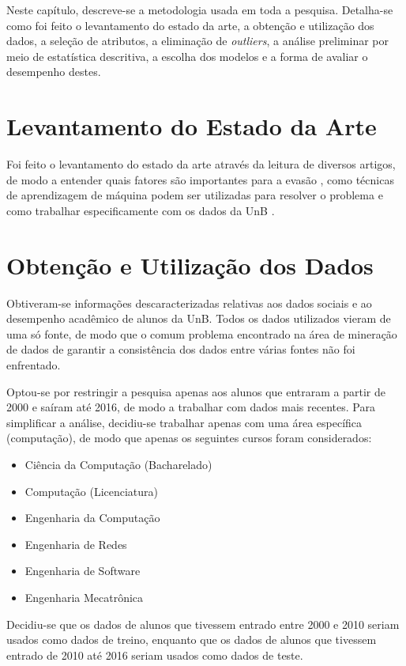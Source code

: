 Neste capítulo, descreve-se a metodologia usada em toda a pesquisa. 
Detalha-se como foi feito o levantamento
do estado da arte, a obtenção e utilização dos dados, a seleção de
atributos, a eliminação de \textit{outliers}, a análise preliminar por meio de estatística
descritiva, a escolha dos modelos e a forma de avaliar o desempenho destes.  

\section{Levantamento do Estado da Arte}
Foi feito o levantamento do estado da arte através da leitura de diversos artigos, de
modo a entender quais fatores são importantes para a evasão \cite{adeodato}
\cite{hoed_fatores} \cite{dropout_finland}, como técnicas de
aprendizagem de máquina podem ser utilizadas para resolver o problema \cite{adeodato}
 \cite{data_mining_retention} 
e como trabalhar especificamente com os dados da UnB \cite{manual_calouro} 
\cite{hoed_sobrevivencia}. 

\section{Obtenção e Utilização dos Dados}
Obtiveram-se informações descaracterizadas relativas aos dados sociais e ao
desempenho acadêmico de alunos da UnB. Todos os dados utilizados vieram de uma só
fonte, de modo que o comum problema encontrado na área de mineração de dados de
garantir a consistência dos dados entre várias fontes não foi enfrentado. 
\par Optou-se por restringir a pesquisa apenas aos alunos que entraram a partir de
2000 e saíram até 2016, de modo a trabalhar com dados mais recentes. 
Para simplificar a análise, decidiu-se trabalhar apenas com uma área
específica (computação), de modo que apenas os seguintes cursos foram considerados: 
\begin{itemize}
    \item Ciência da Computação (Bacharelado)
    \item Computação (Licenciatura)
    \item Engenharia da Computação 
    \item Engenharia de Redes
    \item Engenharia de Software
    \item Engenharia Mecatrônica
\end{itemize}
\par Decidiu-se que os dados de alunos que tivessem entrado entre 2000 e 2010 seriam
usados como dados de treino, enquanto que os dados de alunos que tivessem entrado de
2010 até 2016 seriam usados como dados de teste.

